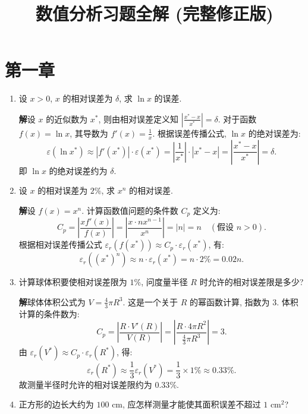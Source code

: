 \documentclass[a4paper,11pt]{ctexart}
\title{数值分析习题全解 (完整修正版)}
\author{}
\date{}
\newcommand{\sol}{\par\noindent\textbf{解}\quad}
\begin{document}
\maketitle

\section*{第一章}

\begin{enumerate}[label=\textbf{1-\arabic*.}, leftmargin=*]
    \item 设 $x>0$, $x$ 的相对误差为 $\delta$, 求 $\ln x$ 的误差.
    
    \sol 设 $x$ 的近似数为 $x^*$, 则由相对误差定义知 $\left| \frac{x^*-x}{x^*} \right| = \delta$. 
    对于函数 $f(x) = \ln x$, 其导数为 $f'(x) = \frac{1}{x}$.
    根据误差传播公式, $\ln x$ 的绝对误差为:
    \[
    \varepsilon(\ln x^*) \approx |f'(x^*)| \cdot \varepsilon(x^*) = \left| \frac{1}{x^*} \right| \cdot |x^* - x| = \left| \frac{x^* - x}{x^*} \right| = \delta.
    \]
    即 $\ln x$ 的绝对误差约为 $\delta$.

    \item 设 $x$ 的相对误差为 $2\%$, 求 $x^n$ 的相对误差.
    
    \sol 设 $f(x) = x^n$. 计算函数值问题的条件数 $C_p$ 定义为:
    \[
    C_p = \left| \frac{x f'(x)}{f(x)} \right| = \left| \frac{x \cdot n x^{n-1}}{x^n} \right| = |n| = n \quad (\text{假设 } n>0).
    \]
    根据相对误差传播公式 $\varepsilon_r(f(x^*)) \approx C_p \cdot \varepsilon_r(x^*)$, 有:
    \[
    \varepsilon_r((x^*)^n) \approx n \cdot \varepsilon_r(x^*) = n \cdot 2\% = 0.02n.
    \]

    \item[5.] 计算球体积要使相对误差限为 $1\%$, 问度量半径 $R$ 时允许的相对误差限是多少?
    
    \sol 球体体积公式为 $V = \frac{4}{3}\pi R^3$. 这是一个关于 $R$ 的幂函数计算, 指数为 3.
    体积计算的条件数为:
    \[
    C_p = \left| \frac{R \cdot V'(R)}{V(R)} \right| = \left| \frac{R \cdot 4\pi R^2}{\frac{4}{3}\pi R^3} \right| = 3.
    \]
    由 $\varepsilon_r(V^*) \approx C_p \cdot \varepsilon_r(R^*)$, 得:
    \[
    \varepsilon_r(R^*) \approx \frac{1}{3} \varepsilon_r(V^*) = \frac{1}{3} \times 1\% \approx 0.33\%.
    \]
    故测量半径时允许的相对误差限约为 $0.33\%$.

    \item[9.] 正方形的边长大约为 $100 \text{ cm}$, 应怎样测量才能使其面积误差不超过 $1 \text{ cm}^2$?
    

\end{enumerate}
\end{document}
